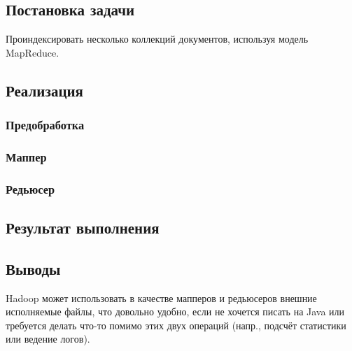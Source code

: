 \documentclass[a4paper, 12pt]{article}
\begin{document}

\newpage


\subsection*{Постановка задачи}
Проиндексировать несколько коллекций документов, используя модель MapReduce.

\subsection*{Реализация}
\subsubsection*{Предобработка}

\subsubsection*{Маппер}

\subsubsection*{Редьюсер}



\subsection*{Результат выполнения}



\subsection*{Выводы}
Hadoop может использовать в качестве мапперов и редьюсеров внешние исполняемые файлы, что довольно удобно, если не хочется писать на Java или требуется делать что-то помимо этих двух операций (напр., подсчёт статистики или ведение логов).
\end{document}

